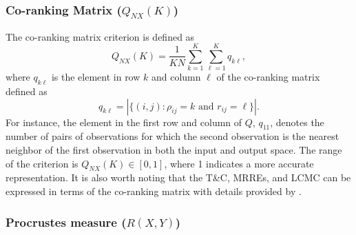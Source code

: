 \documentclass[11pt,a4paper,]{article}
\begin{document}
\hypertarget{co-ranking-matrix-q_nxk}{%
\subsubsection*{\texorpdfstring{Co-ranking Matrix (\(Q_{NX}(K)\))}{Co-ranking Matrix (Q\_\{NX\}(K))}}\label{co-ranking-matrix-q_nxk}}

The co-ranking matrix criterion is defined as
\begin{equation}\label{eq:Q_NX}
  Q_{NX}(K)=\frac{1}{K N} \sum_{k=1}^{K} \sum_{\ell=1}^{K} q_{k\ell},
\end{equation}
where \(q_{k\ell}\) is the element in row \(k\) and column \(\ell\) of the co-ranking matrix defined as
\begin{equation}\label{eq:coRanking}
  q_{k\ell}=|\{(i, j): \rho_{i j}=k \text { and } r_{i j}=\ell\}|.
\end{equation}
For instance, the element in the first row and column of \(Q\), \(q_{11}\), denotes the number of pairs of observations for which the second observation is the nearest neighbor of the first observation in both the input and output space. The range of the criterion is \(Q_{N X}(K) \in[0,1]\), where 1 indicates a more accurate representation. It is also worth noting that the T\&C, MRREs, and LCMC can be expressed in terms of the co-ranking matrix with details provided by \textcite{Lee2008-cx}.

\hypertarget{procrustes-measure-rxy}{%
\subsubsection*{\texorpdfstring{Procrustes measure (\(R(X,Y)\))}{Procrustes measure (R(X,Y))}}\label{procrustes-measure-rxy}}
\end{document}
